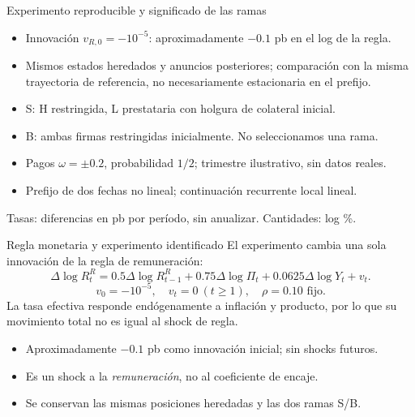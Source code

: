 \documentclass[aspectratio=169,11pt]{beamer}
\begin{document}
\begin{frame}{Experimento reproducible y significado de las ramas}
\begin{itemize}
\item Innovación $v_{R,0}=-10^{-5}$: aproximadamente $-0.1$ pb en el log de la regla.
\item Mismos estados heredados y anuncios posteriores; comparación con la misma
trayectoria de referencia, no necesariamente estacionaria en el prefijo.
\item S: H restringida, L prestataria con holgura de colateral inicial.
\item B: ambas firmas restringidas inicialmente. No seleccionamos una rama.
\item Pagos $\omega=\pm0.2$, probabilidad $1/2$; trimestre ilustrativo, sin datos reales.
\item Prefijo de dos fechas no lineal; continuación recurrente local lineal.
\end{itemize}
Tasas: diferencias en pb por período, sin anualizar. Cantidades: log \%.
\end{frame}

\begin{frame}{Regla monetaria y experimento identificado}
\small
El experimento cambia una sola innovación de la regla de remuneración:
\[
\Delta\log R^R_t
=0.5\Delta\log R^R_{t-1}
+0.75\Delta\log\Pi_t+0.0625\Delta\log Y_t+v_t.
\]
\[
v_0=-10^{-5},\quad v_t=0\ (t\geq1),\quad
\rho=0.10\text{ fijo.}
\]
La tasa efectiva responde endógenamente a inflación y producto, por lo
que su movimiento total no es igual al shock de regla.
\medskip
\begin{itemize}
\item Aproximadamente $-0.1$ pb como innovación inicial; sin shocks futuros.
\item Es un shock a la \emph{remuneración}, no al coeficiente de encaje.
\item Se conservan las mismas posiciones heredadas y las dos ramas S/B.
\end{itemize}
\end{frame}
\end{document}
